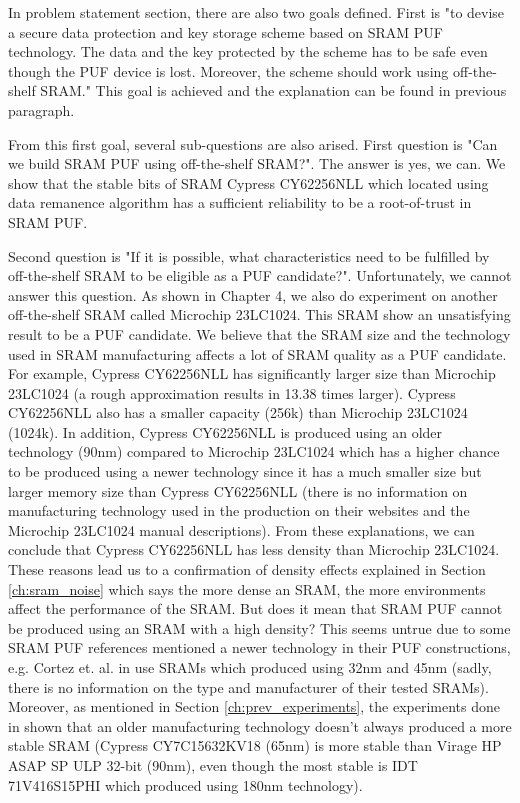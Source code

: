 In problem statement section, there are also two goals defined. First is "to devise a secure data protection and key storage scheme based on SRAM PUF technology. The data and the key protected by the scheme has to be safe even though the PUF device is lost. Moreover, the scheme should work using off-the-shelf SRAM." This goal is achieved and the explanation can be found in previous paragraph.

From this first goal, several sub-questions are also arised. First question is "Can we build SRAM PUF using off-the-shelf SRAM?". The answer is yes, we can. We show that the stable bits of SRAM Cypress CY62256NLL which located using data remanence algorithm has a sufficient reliability to be a root-of-trust in SRAM PUF.

Second question is "If it is possible, what characteristics need to be fulfilled by off-the-shelf SRAM to be eligible as a PUF candidate?". Unfortunately, we cannot answer this question. As shown in Chapter 4, we also do experiment on another off-the-shelf SRAM called Microchip 23LC1024. This SRAM show an unsatisfying result to be a PUF candidate. We believe that the SRAM size and the technology used in SRAM manufacturing affects a lot of SRAM quality as a PUF candidate. For example, Cypress CY62256NLL has significantly larger size than Microchip 23LC1024 (a rough approximation results in 13.38 times larger). Cypress CY62256NLL also has a smaller capacity (256k) than Microchip 23LC1024 (1024k). In addition, Cypress CY62256NLL is produced using an older technology (90nm) compared to Microchip 23LC1024 which has a higher chance to be produced using a newer technology since it has a much smaller size but larger memory size than Cypress CY62256NLL (there is no information on manufacturing technology used in the production on their websites and the Microchip 23LC1024 manual descriptions). From these explanations, we can conclude that Cypress CY62256NLL has less density than Microchip 23LC1024. These reasons lead us to a confirmation of density effects  explained in Section \ref{ch:sram_noise} which says the more dense an SRAM, the more environments affect the performance of the SRAM. But does it mean that SRAM PUF cannot be produced using an SRAM with a high density? This seems untrue due to some SRAM PUF references mentioned a newer technology in their PUF constructions, e.g. Cortez et. al. in \cite{7102498} use SRAMs which produced using 32nm and 45nm (sadly, there is no information on the type and manufacturer of their tested SRAMs). Moreover, as mentioned in Section \ref{ch:prev_experiments}, the experiments done in \cite{Schrijen:2012:CAS:2492708.2493033} shown that an older manufacturing technology doesn't always produced a more stable SRAM (Cypress CY7C15632KV18 (65nm) is more stable than Virage HP ASAP SP ULP 32-bit (90nm), even though the most stable is IDT 71V416S15PHI which produced using 180nm technology).

